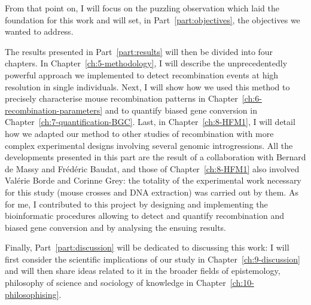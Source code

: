 From that point on, I will focus on the puzzling observation which laid the foundation for this work and will set, in Part~\ref{part:objectives}, the objectives we wanted to address.


The results presented in Part~\ref{part:results} will then be divided into four chapters.
In Chapter~\ref{ch:5-methodology}, I will describe the unprecedentedly powerful approach we implemented to detect recombination events at high resolution in single individuals.
Next, I will show how we used this method to precisely characterise mouse recombination patterns in Chapter~\ref{ch:6-recombination-parameters} and to quantify biased gene conversion in Chapter~\ref{ch:7-quantification-BGC}.
Last, in Chapter~\ref{ch:8-HFM1}, I will detail how we adapted our method to other studies of recombination with more complex experimental designs involving several genomic introgressions.
All the developments presented in this part are the result of a collaboration with Bernard de Massy and Frédéric Baudat, and those of Chapter~\ref{ch:8-HFM1} also involved Valérie Borde and Corinne Grey: the totality of the experimental work necessary for this study (mouse crosses and DNA extraction) was carried out by them.
As for me, I contributed to this project by designing and implementing the bioinformatic procedures allowing to detect and quantify recombination and biased gene conversion and by analysing the ensuing results.

Finally, Part~\ref{part:discussion} will be dedicated to discussing this work: I will first consider the scientific implications of our study in Chapter~\ref{ch:9-discussion} and will then share ideas related to it in the broader fields of epistemology, philosophy of science and sociology of knowledge in Chapter~\ref{ch:10-philosophising}.










